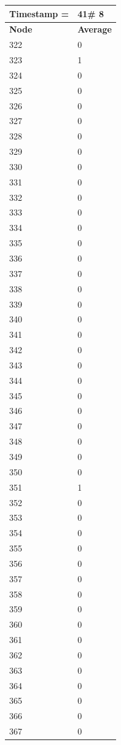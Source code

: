 \begin{tabular}{|l||l|}
\hline
\textbf{Timestamp =} & \textbf{41}\# 8\\\hline
	\textbf{Node} & \textbf{Average} \\ \hline
\hline
	322 & 0 \\ \hline
	323 & 1 \\ \hline
	324 & 0 \\ \hline
	325 & 0 \\ \hline
	326 & 0 \\ \hline
	327 & 0 \\ \hline
	328 & 0 \\ \hline
	329 & 0 \\ \hline
	330 & 0 \\ \hline
	331 & 0 \\ \hline
	332 & 0 \\ \hline
	333 & 0 \\ \hline
	334 & 0 \\ \hline
	335 & 0 \\ \hline
	336 & 0 \\ \hline
	337 & 0 \\ \hline
	338 & 0 \\ \hline
	339 & 0 \\ \hline
	340 & 0 \\ \hline
	341 & 0 \\ \hline
	342 & 0 \\ \hline
	343 & 0 \\ \hline
	344 & 0 \\ \hline
	345 & 0 \\ \hline
	346 & 0 \\ \hline
	347 & 0 \\ \hline
	348 & 0 \\ \hline
	349 & 0 \\ \hline
	350 & 0 \\ \hline
	351 & 1 \\ \hline
	352 & 0 \\ \hline
	353 & 0 \\ \hline
	354 & 0 \\ \hline
	355 & 0 \\ \hline
	356 & 0 \\ \hline
	357 & 0 \\ \hline
	358 & 0 \\ \hline
	359 & 0 \\ \hline
	360 & 0 \\ \hline
	361 & 0 \\ \hline
	362 & 0 \\ \hline
	363 & 0 \\ \hline
	364 & 0 \\ \hline
	365 & 0 \\ \hline
	366 & 0 \\ \hline
	367 & 0 \\ \hline
\end{tabular}

